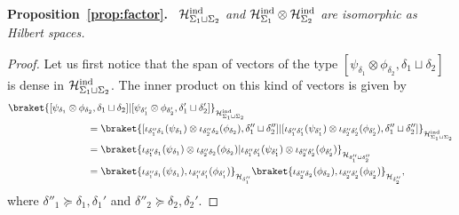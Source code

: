 \documentclass[11pt]{article}
\newcommand{\h}{\mathcal{H}}
\theoremstyle{definition}
\numberwithin{equation}{section}
\begin{document}
\noindent\textbf{Proposition~\ref{prop:factor}.}~\emph{
    $\h_{\Sigma_1\sqcup\Sigma_2}^{\rm ind}$ and $\h_{\Sigma_1}^{\rm ind}\otimes\h_{\Sigma_2}^{\rm ind}$ are isomorphic as Hilbert spaces.}
\begin{proof}
    Let us first notice that the span of vectors of the type $[\psi_{\delta_1}\otimes\phi_{\delta_2} ,\delta_1\sqcup \delta_2]$ is dense in $\h_{\Sigma_1\sqcup\Sigma_2}^{\rm ind}$. The inner product on this kind of vectors is given by
    \begin{align*}
        &\braket{[\psi_{\delta_1}\otimes\phi_{\delta_2},\delta_1\sqcup\delta_2]|[\psi_{\delta'_1}\otimes\phi_{\delta'_2},\delta'_1\sqcup\delta'_2]}_{\h_{\Sigma_1\sqcup\Sigma_2}^{\rm ind}}\\
        &\qquad\qquad\qquad\qquad=\braket{[\iota_{\delta''_1\delta_1}(\psi_{\delta_1})\otimes\iota_{\delta''_2\delta_2}(\phi_{\delta_2}),\delta''_1\sqcup\delta''_2]|[\iota_{\delta''_1\delta'_1}(\psi_{\delta'_1})\otimes\iota_{\delta''_2\delta'_2}(\phi_{\delta'_2}),\delta''_1\sqcup\delta''_2]}_{\h_{\Sigma_1\sqcup\Sigma_2}^{\rm ind}}\\
        &\qquad\qquad\qquad\qquad=\braket{\iota_{\delta''_1\delta_1}(\psi_{\delta_1})\otimes\iota_{\delta''_2\delta_2}(\phi_{\delta_2})|\iota_{\delta''_1\delta'_1}(\psi_{\delta'_1})\otimes\iota_{\delta''_2\delta'_2}(\phi_{\delta'_2})}_{\h_{\delta''_1\sqcup\delta''_2}}\\
        &\qquad\qquad\qquad\qquad=\braket{\iota_{\delta''_1\delta_1}(\psi_{\delta_1}),\iota_{\delta''_1\delta'_1}(\phi_{\delta'_1})}_{\h_{\delta''_1}}\braket{\iota_{\delta''_2\delta_2}(\phi_{\delta_2}),\iota_{\delta''_2\delta'_2}(\phi_{\delta'_2})}_{\h_{\delta''_2}},
    \end{align*}
    where $\delta''_1\succeq\delta_1,\delta_1'$ and $\delta''_2\succeq\delta_2,\delta_2'$.


\end{proof}
\end{document}
